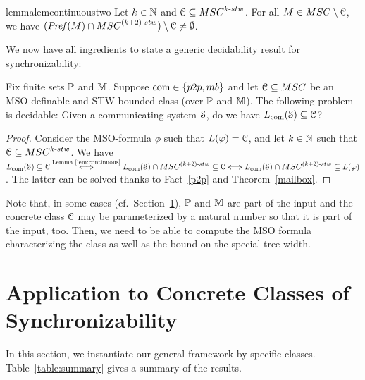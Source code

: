 \documentclass[a4paper,UKenglish,cleveref, autoref, thm-restate]{lipics-v2021}
\begin{document}
\begin{restatable}{lemma}{lemcontinuoustwo}\label{lem:continuous2}
	Let $k \in \mathbb{N}$ and $\Class \subseteq \stwMSCs{k}$. For all
	$M \in \MSCs \setminus \Class$, we have
	$(\Pref{M} \cap \stwMSCs{(k+2)}) \setminus \Class \neq \emptyset$.
\end{restatable}


We now have all ingredients to state a generic decidability result
for synchronizability:

\begin{theorem}\label{thm:sync}
Fix finite sets $\mathbb{P}$ and $\mathbb{M}$.
Suppose $\comsymb \in \{\ppsymb, \mbsymb\}$ and let $\Class \subseteq \MSCs$ be an MSO-definable and STW-bounded class (over $\mathbb{P}$ and $\mathbb{M}$).
The following problem is decidable:
Given a communicating system $\mathcal{S}$, do we have $L_{\textup{com}}(\mathcal{S}) \subseteq \mathcal{C}$?
\end{theorem}

\begin{proof}
Consider the MSO-formula $\phi$ such that $L(\varphi) = \mathcal{C}$, and
let $k \in \mathbb{N}$ such that $\Class \subseteq \stwMSCs{k}$.
We have
$\cL{\System} \subseteq \Class
 \stackrel{\textup{Lemma~\ref{lem:continuous}}}{\Longleftrightarrow} \cL{\System} \cap \stwMSCs{(k+2)} \subseteq \Class
 \Longleftrightarrow \cL{\System} \cap \stwMSCs{(k+2)} \subseteq L(\phi)$.
The latter can be solved thanks to Fact~\ref{p2p} and Theorem~\ref{mailbox}.
\end{proof}

\begin{remark}
Note that, in some cases (cf.\ Section~\ref{sec:concrete-classes}),
$\mathbb{P}$ and $\mathbb{M}$ are part of the input
and the concrete class $\mathcal{C}$ may be parameterized by a natural number
so that it is part of the input, too. Then, we need to be able to compute the
MSO formula characterizing the class as well as the bound on the special tree-width.
\end{remark}





\section{Application to Concrete Classes of Synchronizability}
\label{sec:concrete-classes}

In this section, we instantiate our general framework by specific classes. Table~\ref{table:summary} gives a summary of the results.
\end{document}
